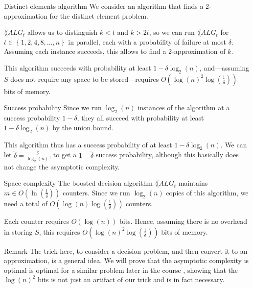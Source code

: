 \documentclass[a4paper]{article}
\begin{document}
\begin{parag}{Distinct elements algorithm}
    We consider an algorithm that finds a 2-approximation for the distinct element problem.

    $\lang{ALG}_t$ allows us to distinguish $k < t$ and $k > 2t$, so we can run $\lang{ALG}_t$ for $t \in \left\{1, 2, 4, 8, \ldots, n\right\}$ in parallel, each with a probability of failure at most $\delta$. Assuming each instance succeeds, this allows to find a 2-approximation of $k$.

    This algorithm succeeds with probability at least $1 - \delta \log_2\left(n\right)$, and---assuming $S$ does not require any space to be stored---requires $O\left(\log\left(n\right)^2 \log\left(\frac{1}{\delta}\right)\right)$ bits of memory.

    \begin{subparag}{Success probability}
        Since we run $\log_2\left(n\right)$ instances of the algorithm at a success probability $1 - \delta$, they all succeed with probability at least $1 - \delta \log_2\left(n\right)$ by the union bound.

        This algorithm thus has a success probability of at least $1 - \delta \log_2\left(n\right)$. We can let $\widetilde{\delta} = \frac{\delta}{\log_2\left(n\right)}$, to get a $1 - \widetilde{\delta}$ success probability, although this basically does not change the asymptotic complexity.
    \end{subparag}

    \begin{subparag}{Space complexity}
        The boosted decision algorithm $\lang{ALG}_t$ maintains $m \in O\left(\ln\left(\frac{1}{\delta}\right)\right)$ counters. Since we run $\log_{2}\left(n\right)$ copies of this algorithm, we need a total of $O\left(\log\left(n\right) \log\left(\frac{1}{\delta}\right)\right)$ counters. 

        Each counter requires $O\left(\log\left(n\right)\right)$ bits. Hence, assuming there is no overhead in storing $S$, this requires $O\left(\log\left(n\right)^2 \log\left(\frac{1}{\delta}\right)\right)$ bits of memory.
    \end{subparag}

    \begin{subparag}{Remark}
        The trick here, to consider a decision problem, and then convert it to an approximation, is a general idea. We will prove that the asymptotic complexity is optimal is optimal for a similar problem later in the course , showing that the $\log\left(n\right)^2$ bits is not just an artifact of our trick and is in fact necessary.
    \end{subparag}
\end{parag}
\end{document}
